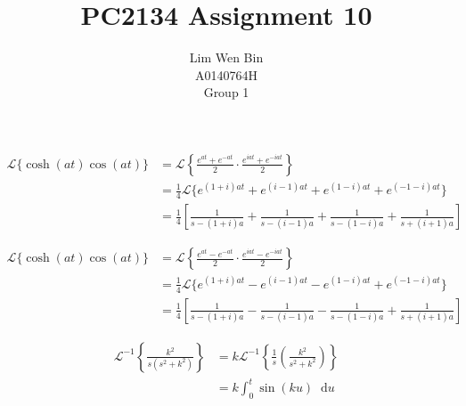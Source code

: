 \documentclass[12pt]{article}
\newcommand*\diff{\mathop{}\!\mathrm{d}}
\newenvironment{problem}[2][Problem]{\begin{trivlist}
\item[\hskip \labelsep {\bfseries #1}\hskip \labelsep {\bfseries #2.}]}{\end{trivlist}}
\begin{document}
\title{PC2134 Assignment 10}
\author{Lim Wen Bin \\
A0140764H\\
Group 1}
\maketitle

\begin{problem}{1.a}
\end{problem}
\begin{align*}
	\mathcal{L} \{ \cosh(at) \cos(at) \}
	&= \mathcal{L} \left\{ 
		\frac{e^{at} + e^{-at}}{2}
		\cdot
		\frac{e^{iat} + e^{-iat}}{2}
	\right\} \\
	&= \frac{1}{4} \mathcal{L} \{ 
		e^{(1+i)at} + e^{(i-1)at}
		+ e^{(1-i)at} + e^{(-1-i)at}
	\} \\
	&= \frac{1}{4} \left[
		\frac{1}{s-(1+i)a}
		+ \frac{1}{s-(i-1)a}
		+ \frac{1}{s-(1-i)a}
		+ \frac{1}{s+(i+1)a}
	\right]
\end{align*}

\begin{problem}{1.b}
\end{problem}
\begin{align*}
	\mathcal{L} \{ \cosh(at) \cos(at) \}
	&= \mathcal{L} \left\{ 
		\frac{e^{at} - e^{-at}}{2}
		\cdot
		\frac{e^{iat} - e^{-iat}}{2}
	\right\} \\
	&= \frac{1}{4} \mathcal{L} \{ 
		e^{(1+i)at} - e^{(i-1)at}
		- e^{(1-i)at} + e^{(-1-i)at}
	\} \\
	&= \frac{1}{4} \left[
		\frac{1}{s-(1+i)a}
		- \frac{1}{s-(i-1)a}
		- \frac{1}{s-(1-i)a}
		+ \frac{1}{s+(i+1)a}
	\right]
\end{align*}

\begin{problem}{2.a}
\end{problem}
\begin{align*}
	\mathcal{L}^{-1} \left\{ \frac{k^2}{s(s^2+k^2)} \right\}
	&= k \mathcal{L}^{-1} \left\{ \frac{1}{s} \left( \frac{k^2}{s^2+k^2}
		\right) \right\} \\
	&= k \int_0^t \sin(ku) \diff u
\end{align*}
\filbreak
\end{document}
